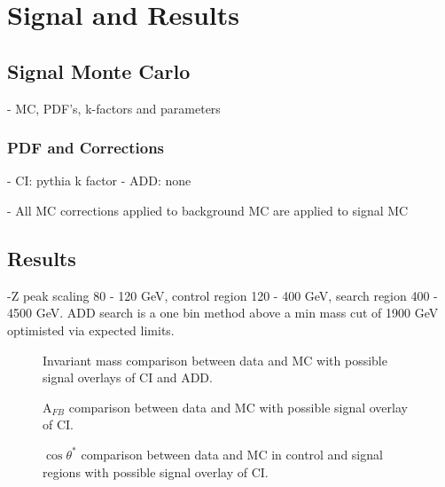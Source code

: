 \chapter{Signal and Results}


\section{Signal Monte Carlo}
{\normalsize - MC, PDF's, k-factors and parameters}

\subsection{PDF and Corrections}

	- CI: pythia k factor
	- ADD: none

	- All MC corrections applied to background MC are applied to signal MC

\section{Results}

	-Z peak scaling 80 - 120 GeV, control region 120 - 400 GeV, search region 400 - 4500 GeV. ADD search is a one bin method above a min mass cut of 1900 GeV optimisted via expected limits.


	\begin{figure}[h]
	    \begin{center}
	    \end{center}
	   \caption{Invariant mass comparison between data and MC with possible signal overlays of CI and ADD.}
	   \label{fig:C5_sub_iso_efficiency}
	\end{figure}

	\begin{figure}[h]
	    \begin{center}
	    \end{center}
	   \caption{A$_{FB}$ comparison between data and MC with possible signal overlay of CI.}
	   \label{fig:C5_sub_iso_efficiency}
	\end{figure}


	\begin{figure}[h]
	    \begin{center}
	    \end{center}
	   \caption{$\cos{\theta^{*}}$ comparison between data and MC in control and signal regions with possible signal overlay of CI.}
	   \label{fig:C5_sub_iso_efficiency}
	\end{figure}



